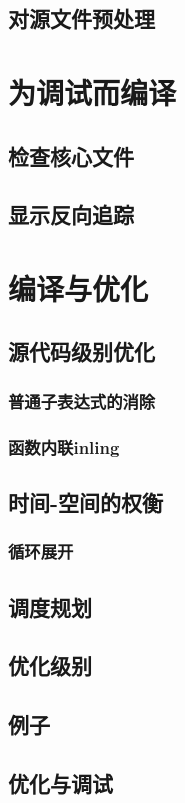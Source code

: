 \documentclass[lang=cn,12pt,newtx,scheme=chinese]{elegantbook}
\begin{document}
\section{对源文件预处理}

\chapter{为调试而编译}
\section{检查核心文件}
\section{显示反向追踪}

\chapter{编译与优化}
\section{源代码级别优化}
\subsection{普通子表达式的消除}
\subsection{函数内联inling}
\section{时间-空间的权衡}
\subsection{循环展开}
\section{调度规划}
\section{优化级别}
\section{例子}
\section{优化与调试}
\end{document}
